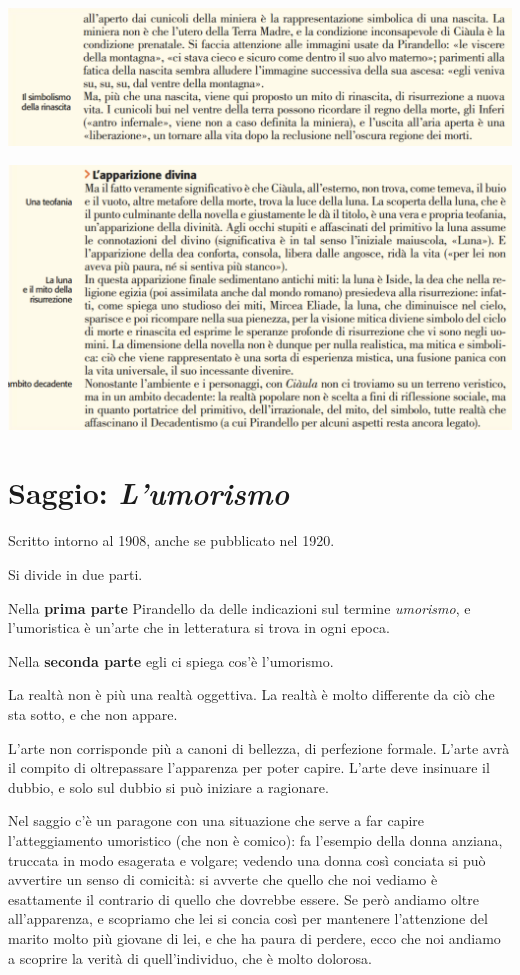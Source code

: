 \documentclass[a4paper, twoside, titlepage]{book}
\newcounter{mar}
\begin{document}
\begin{center}
\includegraphics[width=\textwidth]{ciaula2}
\end{center}

\begin{center}
\includegraphics[width=\textwidth]{ciaula3}
\end{center}
\vfill

\chapter{Saggio: \textit{L'umorismo}}

Scritto intorno al 1908, anche se pubblicato nel 1920.

Si divide in due parti.

Nella \textbf{prima parte} Pirandello da delle indicazioni sul termine \textit{umorismo}, e l'umoristica è un'arte che in letteratura si trova in ogni epoca.

Nella \textbf{seconda parte} egli ci spiega cos'è l'umorismo.

La realtà non è più una realtà oggettiva. La realtà è molto differente da ciò che sta sotto, e che non appare.

L'arte non corrisponde più a canoni di bellezza, di perfezione formale. L'arte avrà il compito di oltrepassare l'apparenza per poter capire. L'arte deve insinuare il dubbio, e solo sul dubbio si può iniziare a ragionare.

Nel saggio c'è un paragone con una situazione che serve a far capire l'atteggiamento umoristico (che non è comico): fa l'esempio della donna anziana, truccata in modo esagerata e volgare; vedendo una donna così conciata si può avvertire un senso di comicità: si avverte che quello che noi vediamo è esattamente il contrario di quello che dovrebbe essere. Se però andiamo oltre all'apparenza, e scopriamo che lei si concia così per mantenere l'attenzione del marito molto più giovane di lei, e che ha paura di perdere, ecco che noi andiamo a scoprire la verità di quell'individuo, che è molto dolorosa.
\end{document}
